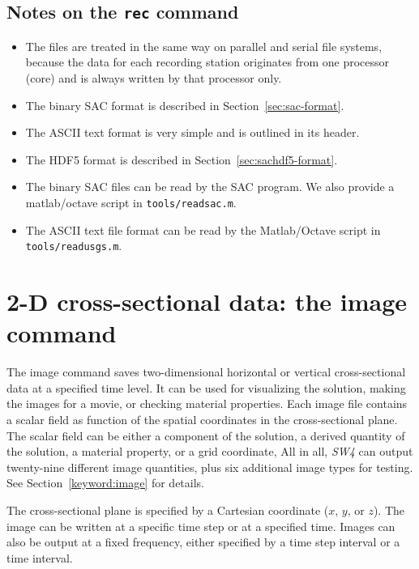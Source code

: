 \documentclass[11pt]{report}
\begin{document}
\subsection{Notes on the {\tt rec} command}
\begin{itemize}
\item The files are treated in the same way on parallel and serial file systems, because the data
  for each recording station originates from one processor (core) and is always written by that processor only.
\item The binary SAC format is described in Section~\ref{sec:sac-format}.
\item The ASCII text format is very simple and is outlined in its header.
\item The HDF5 format is described in Section~\ref{sec:sachdf5-format}.
\item The binary SAC files can be read by the SAC program. We also provide a matlab/octave script in
  {\tt tools/readsac.m}.
\item The ASCII text file format can be read by the Matlab/Octave script in {\tt tools/readusgs.m}.
\end{itemize}

\section{2-D cross-sectional data: the image command}
The image command saves two-dimensional horizontal or vertical cross-sectional data at a specified
time level. It can be used for visualizing the solution, making the images for a movie, or checking
material properties. Each image file contains a scalar field as function of the spatial coordinates
in the cross-sectional plane. The scalar field can be either a component of the solution, a derived
quantity of the solution, a material property, or a grid coordinate, All in all, \emph{SW4} can
output twenty-nine different image quantities, plus six additional image types for testing. See
Section~\ref{keyword:image} for details.

The cross-sectional plane is specified by a Cartesian coordinate ($x$, $y$, or $z$). The image can
be written at a specific time step or at a specified time. Images can also be output at a fixed
frequency, either specified by a time step interval or a time interval.
\end{document}
